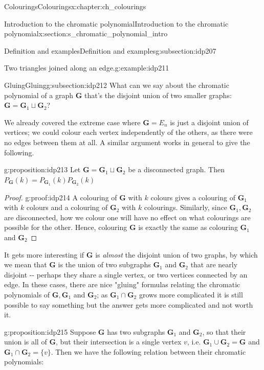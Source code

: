 \documentclass[oneside,10pt,]{book}
\numberwithin{equation}{section}
\newcommand{\bfG}{\mathbf{G}}
\begin{document}
\begin{chapterptx}{Colourings}{}{Colourings}{}{}{x:chapter:ch_colourings}
\begin{sectionptx}{Introduction to the chromatic polynomial}{}{Introduction to the chromatic polynomial}{}{}{x:section:s_chromatic_polynomial_intro}
\begin{subsectionptx}{Definition and examples}{}{Definition and examples}{}{}{g:subsection:idp207}
\begin{example}{Two triangles joined along an edge.}{g:example:idp211}
\begin{sidebyside}{2}{0.025}{0.025}{0.05}
\begin{sbspanel}{0.3}
{\begin{tikzpicture}[scale=2]
\end{tikzpicture}
}%
\end{sbspanel}%
\end{sidebyside}%
\end{example}
\end{subsectionptx}
%
%
\typeout{************************************************}
\typeout{************************************************}
%
\begin{subsectionptx}{Gluing}{}{Gluing}{}{}{g:subsection:idp212}
What can we say about the chromatic polynomial of a graph \(\bfG\) that's the disjoint union of two smaller graphs: \(\bfG=\bfG_1\sqcup \bfG_2\)?%
\par
We already covered the extreme case where \(\bfG=E_n\) is just a disjoint union of vertices; we could colour each vertex independently of the others, as there were no edges between them at all. A similar argument works in general to give the following.%
\begin{proposition}{}{}{g:proposition:idp213}%
Let \(\bfG=\bfG_1\sqcup \bfG_2\) be a disconnected graph.  Then \(P_{\bfG}(k)=P_{\bfG_1}(k)P_{\bfG_2}(k)\)%
\end{proposition}
\begin{proof}{}{g:proof:idp214}
A colouring of \(\bfG\) with \(k\) colours gives a colouring of \(\bfG_1\) with \(k\) colours and a colouring of \(\bfG_2\) with \(k\) colourings. Similarly, since \(\bfG_1, \bfG_2\) are disconnected, how we colour one will have no effect on what colourings are possible for the other.  Hence, colouring \(\bfG\) is exactly the same as colouring \(\bfG_1\) and \(\bfG_2\)%
\end{proof}
 It gets more interesting if \(\bfG\) is \emph{almost} the disjoint union of two graphs, by which we mean that \(\bfG\) is the union of two subgraphs \(\bfG_1\) and \(\bfG_2\) that are nearly disjoint -{}-{} perhaps they share a single vertex, or two vertices connected by an edge.  In these cases, there are nice "gluing" formulas relating the chromatic polynomials of \(\bfG, \bfG_1\) and \(\bfG_2\); as \(\bfG_1\cap\bfG_2\) grows more complicated it is still possible to say something but the answer gets more complicated and not worth it. \begin{proposition}{}{}{g:proposition:idp215}%
Suppose \(\bfG\) has two subgraphs \(\bfG_1\) and \(\bfG_2\), so that their union is all of \(\bfG\), but their intersection is a single vertex \(v\), i.e. \(\bfG_1\cup\bfG_2=\bfG\) and \(\bfG_1\cap\bfG_2=\{v\}\).  Then we have the following relation between their chromatic polynomials:%

\end{proposition}
\end{subsectionptx}
\end{sectionptx}
\end{chapterptx}
\end{document}
